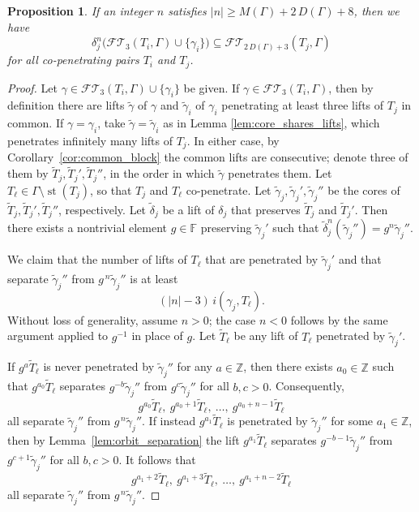 \documentclass[12pt,a4paper]{amsart}
\numberwithin{equation}{section}
\newcommand{\FF}{\mathbb{F}}
\newcommand{\ZZ}{\mathbb{Z}}
\theoremstyle{plain}
\newtheorem{proposition}[theorem]{Proposition}
\theoremstyle{definition}
\theoremstyle{remark}
\begin{document}
\begin{proposition} \label{prop:co-penetrating}
    If an integer $n$ satisfies $\lvert n \rvert \geq M(\Gamma) + 2\,D(\Gamma) + 8$, then we have
    \[
        \delta_j^n\bigl(\mathcal{FT}\!_3(T_i, \Gamma) \cup \{\gamma_i\}\bigr) \subseteq \mathcal{FT}\!_{2\,D(\Gamma)+3}(T_j, \Gamma)
    \]
    for all co-penetrating pairs $T_i$ and $T_j$.
\end{proposition}

\begin{proof}
    Let $\gamma \in \mathcal{FT}\!_3(T_i, \Gamma) \cup \{\gamma_i\}$ be given.
    If $\gamma \in \mathcal{FT}\!_3(T_i, \Gamma)$, then by definition there are lifts $\tilde\gamma$ of $\gamma$ and $\tilde\gamma_i$ of $\gamma_i$ penetrating at least three lifts of $T_j$ in common.
    If $\gamma = \gamma_i$, take $\tilde\gamma = \tilde\gamma_i$ as in Lemma \ref{lem:core_shares_lifts}, which penetrates infinitely many lifts of $T_j$.
    In either case, by Corollary~\ref{cor:common_block} the common lifts are consecutive; denote three of them by $\tilde T_j, \tilde T_j', \tilde T_j''$, in the order in which $\tilde\gamma$ penetrates them.
    Let $T_\ell \in \Gamma \setminus \operatorname{st}(T_j)$, so that $T_j$ and $T_\ell$ co-penetrate.
    Let $\tilde\gamma_j, \tilde\gamma_j', \tilde\gamma_j''$ be the cores of $\tilde{T}_j, \tilde{T}_j', \tilde{T}_j''$, respectively.
    Let $\tilde\delta_j$ be a lift of $\delta_j$ that preserves $\tilde{T}_j$ and $\tilde{T}_j'$.
    Then there exists a nontrivial element $g \in \FF$ preserving $\tilde\gamma_j'$ such that $\tilde\delta_j^n(\tilde\gamma_j'') = g^n \tilde\gamma_j''$.

    We claim that the number of lifts of $T_\ell$ that are penetrated by $\tilde{\gamma}_j'$ and that separate $\tilde{\gamma}_j''$ from $g^{\,n}\tilde{\gamma}_j''$ is at least
    \[
        (\lvert n \rvert - 3)\, i(\gamma_j, T_\ell).
    \]
    Without loss of generality, assume $n > 0$; the case $n < 0$ follows by the same argument applied to $g^{-1}$ in place of $g$.
    Let $\tilde{T}_\ell$ be any lift of $T_\ell$ penetrated by $\tilde{\gamma}_j'$.

    If $g^a\tilde{T}_\ell$ is never penetrated by $\tilde{\gamma}_j''$ for any $a \in \ZZ$, then there exists $a_0 \in \ZZ$ such that $g^{a_0}\tilde{T}_\ell$ separates $g^{-b}\tilde{\gamma}_j''$ from $g^{c}\tilde{\gamma}_j''$ for all $b, c > 0$.
    Consequently,
    \[
        g^{a_0}\tilde{T}_\ell,\ g^{a_0+1}\tilde{T}_\ell,\ \dots,\ g^{a_0+n-1}\tilde{T}_\ell
    \]
    all separate $\tilde{\gamma}_j''$ from $g^{\,n}\tilde{\gamma}_j''$.
    If instead $g^{a_1}\tilde{T}_\ell$ is penetrated by $\tilde{\gamma}_j''$ for some $a_1 \in \ZZ$, then by Lemma~\ref{lem:orbit_separation} the lift $g^{a_1}\tilde{T}_\ell$ separates $g^{-b-1}\tilde\gamma_j''$ from $g^{c+1}\tilde\gamma_j''$ for all $b, c > 0$.
    It follows that
    \[
        g^{a_1+2}\tilde{T}_\ell,\ g^{a_1+3}\tilde{T}_\ell,\ \dots,\ g^{a_1+n-2}\tilde{T}_\ell
    \]
    all separate $\tilde{\gamma}_j''$ from $g^{\,n}\tilde{\gamma}_j''$.


\end{proof}
\end{document}
